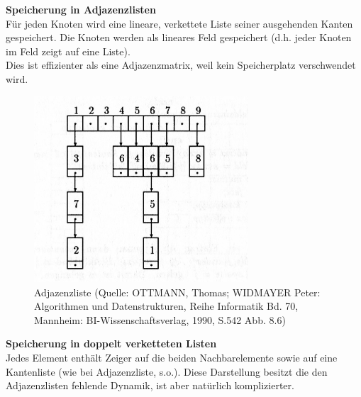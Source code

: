\textbf{Speicherung in Adjazenzlisten}\\
Für jeden Knoten wird eine lineare, verkettete Liste seiner ausgehenden Kanten gespeichert.
Die Knoten werden als lineares Feld gespeichert (d.h. jeder Knoten im Feld zeigt auf eine Liste). \\
Dies ist effizienter als eine Adjazenzmatrix, weil kein Speicherplatz verschwendet wird. \\

\begin{figure}[h]
\centering
\includegraphics[width = 8cm]{./chapters/adjazenzliste.jpg}
\caption{Adjazenzliste {\tiny (Quelle: OTTMANN, Thomas; WIDMAYER Peter: Algorithmen und Datenstrukturen, Reihe Informatik Bd. 70, Mannheim: BI-Wissenschaftsverlag, 1990, S.542 Abb. 8.6)} }
\label{a3}
\end{figure} 

\textbf{Speicherung in doppelt verketteten Listen}\\
Jedes Element enthält Zeiger auf die beiden Nachbarelemente sowie auf eine Kantenliste (wie bei Adjazenzliste, s.o.).
Diese Darstellung besitzt die den Adjazenzlisten fehlende Dynamik, ist aber natürlich komplizierter.

